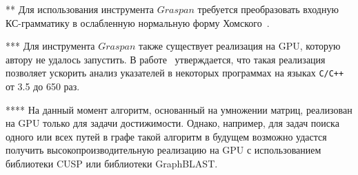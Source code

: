 \begin{table} [h]
\begin{threeparttable}
{\begin{tablenotes}
            \item[**] Для использования инструмента $\textit{Graspan}$ требуется преобразовать входную КС-грамматику в ослабленную нормальную форму Хомского~\cite{graspan}.
            \item[***] Для инструмента $\textit{Graspan}$ также существует реализация на GPU, которую автору не удалось запустить. В работе~\cite{graspan} утверждается, что такая реализация позволяет ускорить анализ указателей в некоторых программах на языках \texttt{C/C++} от 3.5 до 650 раз.
            \item[****] На данный момент алгоритм, основанный на умножении матриц, реализован на GPU только для задачи достижимости. Однако, например, для задач поиска одного или всех путей в графе такой алгоритм в будущем возможно удастся получить высокопроизводительную реализацию на GPU с использованием библиотеки CUSP или библиотеки GraphBLAST.
  \end{tablenotes}    }
  \end{threeparttable}
\end{table}


\clearpage